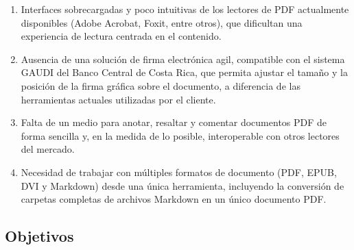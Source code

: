 \begin{enumerate}
    \item Interfaces sobrecargadas y poco intuitivas de los lectores de PDF actualmente disponibles (Adobe Acrobat, Foxit, entre otros), que dificultan una experiencia de lectura centrada en el contenido.
    \item Ausencia de una solución de firma electrónica agil, compatible con el sistema GAUDI del Banco Central de Costa Rica, que permita ajustar el tamaño y la posición de la firma gráfica sobre el documento, a diferencia de las herramientas actuales utilizadas por el cliente.
    \item Falta de un medio para anotar, resaltar y comentar documentos PDF de forma sencilla y, en la medida de lo posible, interoperable con otros lectores del mercado.
    \item Necesidad de trabajar con múltiples formatos de documento (PDF, EPUB, DVI y Markdown) desde una única herramienta, incluyendo la conversión de carpetas completas de archivos Markdown en un único documento PDF.
\end{enumerate}

\subsection{Objetivos}

%






